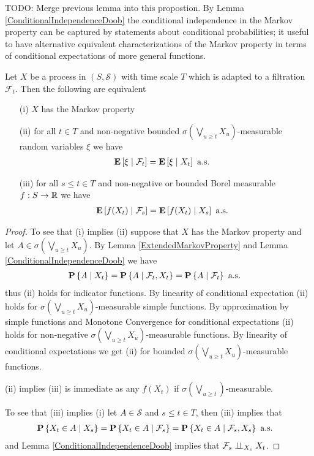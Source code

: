 TODO: Merge previous lemma into this propostion.
By Lemma \ref{ConditionalIndependenceDoob} the conditional independence in the Markov property can be captured by statements about conditional probabilities; it useful to have alternative equivalent characterizations of the Markov property in terms of conditional expectations of more general functions.
\begin{prop}\label{MarkovPropertyViaConditionalExpectations}Let $X$ be a process in $(S, \mathcal{S})$ with time scale
  $T$ which is adapted to a filtration $\mathcal{F}_t$.  Then the
  following are equivalent
\begin{itemize}
\item[(i)] $X$ has the Markov property
\item[(ii)] for all $t \in T$ and non-negative bounded $\sigma(\bigvee_{u \geq t}  X_u)$-measurable random variables $\xi$ we have
\begin{align*}
\cexpectationlong{\mathcal{F}_t}{\xi} &= \cexpectationlong{X_t}{\xi} \text{ a.s.}
\end{align*}
\item[(iii)] for all $s \leq t \in T$ and non-negative or bounded Borel measurable $f : S \to \reals$ we have
\begin{align*}
\cexpectationlong{\mathcal{F}_s}{f(X_t)} &= \cexpectationlong{X_s}{f(X_t)} \text{ a.s.}
\end{align*}
\end{itemize}
\end{prop}
\begin{proof}
To see that (i) implies (ii) suppose that $X$ has the Markov property and let $A \in \sigma(\bigvee_{u \geq t}  X_u)$.  By Lemma \ref{ExtendedMarkovProperty}
and Lemma \ref{ConditionalIndependenceDoob} we have
\begin{align*}
\cprobability{X_t}{A} &=
  \cprobability{\mathcal{F}_t, X_t}{A} =   \cprobability{\mathcal{F}_t}{A} \text{ a.s.}
\end{align*}
thus (ii) holds for indicator functions.  By linearity of conditional expectation (ii) holds for $\sigma(\bigvee_{u \geq t}  X_u)$-measurable simple functions.  By approximation by simple functions and Monotone Convergence for conditional expectations (ii) holds for non-negative $\sigma(\bigvee_{u \geq t}  X_u)$-measurable functions.  By linearity of conditional expectations we get (ii) for bounded $\sigma(\bigvee_{u \geq t}  X_u)$-measurable functions.

(ii) implies (iii) is immediate as any $f(X_t)$ if $\sigma(\bigvee_{u \geq t})$-measurable.

To see that (iii) implies (i) let $A \in \mathcal{S}$ and $s \leq t \in T$, then (iii) implies that 
\begin{align*}
\cprobability{X_s}{X_t \in A} 
&=  \cprobability{\mathcal{F}_s}{X_t \in A} 
= \cprobability{\mathcal{F}_s, X_s}{X_t \in A} \text{ a.s.}
\end{align*}
and Lemma \ref{ConditionalIndependenceDoob} implies that $\cindependent{\mathcal{F}_s}{X_t}{X_s}$.
\end{proof}

